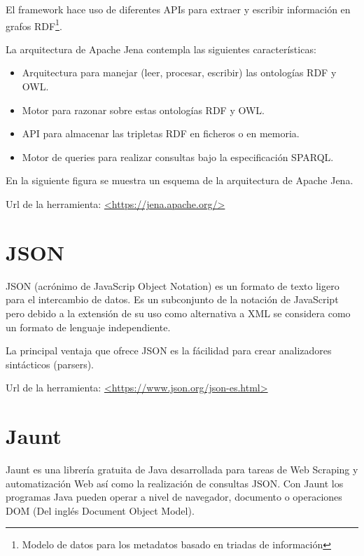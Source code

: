 El framework hace uso de diferentes APIs para extraer y escribir información en grafos RDF\footnote{Modelo de datos para los metadatos basado en triadas de información}.\cite{wiki:jena}

La arquitectura de Apache Jena contempla las siguientes características:

\begin{itemize}
	\item{Arquitectura para manejar (leer, procesar, escribir) las ontologías RDF y OWL.}
	\item{Motor para razonar sobre estas ontologías RDF y OWL.}
	\item{API para almacenar las tripletas RDF en ficheros o en memoria.}
	\item{Motor de queries para realizar consultas bajo la especificación SPARQL.}\cite{jena}
\end{itemize}

En la siguiente figura se muestra un esquema de la arquitectura de Apache Jena.


Url de la herramienta: \url{<https://jena.apache.org/>}

\section{JSON}

JSON (acrónimo de JavaScrip Object Notation) es un formato de texto ligero para el intercambio de datos. Es un subconjunto de la notación de JavaScript pero debido a la extensión de su uso como alternativa a XML se considera como un formato de lenguaje independiente.

La principal ventaja que ofrece JSON es la fácilidad para crear analizadores sintácticos (parsers). \cite{wiki:JSON}

Url de la herramienta: \url{<https://www.json.org/json-es.html>}

\section{Jaunt}

Jaunt es una librería gratuita de Java desarrollada para tareas de Web Scraping y automatización Web así como la realización de consultas JSON. Con Jaunt los programas Java pueden operar a nivel de navegador, documento o operaciones DOM (Del inglés Document Object Model).

